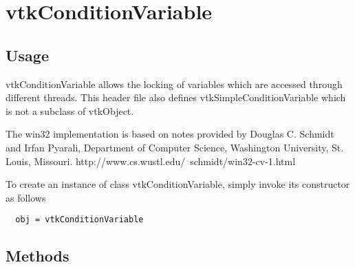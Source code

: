 \section{vtkConditionVariable}

\subsection{Usage}

 vtkConditionVariable allows the locking of variables which are accessed 
 through different threads.  This header file also defines 
 vtkSimpleConditionVariable which is not a subclass of vtkObject.

 The win32 implementation is based on notes provided by
 Douglas C. Schmidt and Irfan Pyarali,
 Department of Computer Science,
 Washington University, St. Louis, Missouri.
 http://www.cs.wustl.edu/~schmidt/win32-cv-1.html

To create an instance of class vtkConditionVariable, simply
invoke its constructor as follows
\begin{verbatim}
  obj = vtkConditionVariable
\end{verbatim}
\subsection{Methods}

